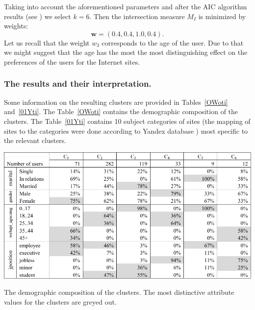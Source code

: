\documentclass[runningheads,a4paper]{llncs}
\begin{document}
Taking into account the aforementioned parameters and after the AIC algorithm results (see \cite{aic}) we select $k=6$. Then the intersection measure $M_I$ is minimized by weights:
\[
	\boldsymbol{w} = (0.4, 0.4, 1.0, 0.4).
\]
Let us recall that the weight $w_3$ corresponds to the age of the user. Due to that we might suggest that the age has the most the most distinguishing effect on the preferences of the users for the Internet sites.


\subsubsection{The results and their interpretation.}

Some information on the resulting clusters are provided in Tables~\ref{OWoti} and~\ref{01Yti}. The Table~\ref{OWoti} contains the demographic composition of the clusters. The Table~\ref{01Yti} contains 10 subject categories of sites (the mapping of sites to the categories were done according to Yandex database \cite{yandex}) most specific to the relevant clusters.


\begin{table}
	\includegraphics[width=\linewidth]{t1.pdf}
	
	\caption{The demographic composition of the clusters. The most distinctive attribute values for the clusters are greyed out.}
	\label{OWoti}
\end{table}
\end{document}
